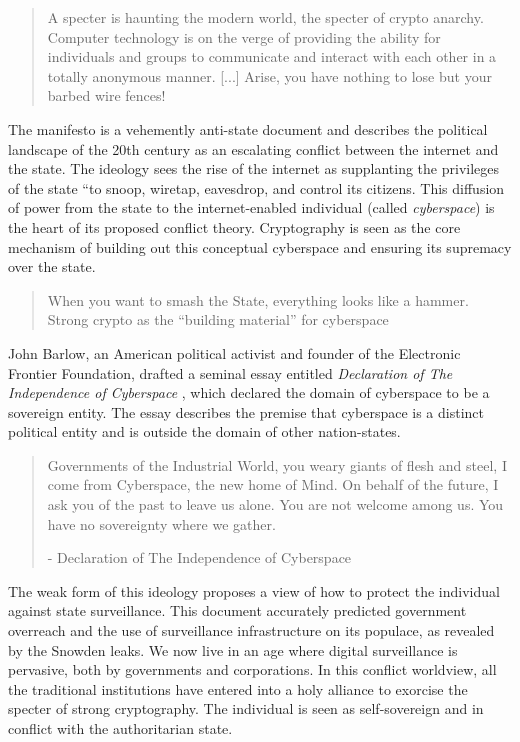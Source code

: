 
\begin{quote}
A specter is haunting the modern world, the specter of crypto anarchy.
Computer technology is on the verge of providing the ability for
individuals and groups to communicate and interact with each other in a
totally anonymous manner. [...] Arise, you have nothing to lose
but your barbed wire fences!
\end{quote}

The manifesto is a vehemently anti-state document and describes the political
landscape of the 20th century as an escalating conflict between the internet and
the state. The ideology sees the rise of the internet as supplanting the
privileges of the state ``to snoop, wiretap, eavesdrop, and control its
citizens.  This diffusion of power from the state to the internet-enabled
individual (called \textit{cyberspace}) is the heart of its proposed conflict
theory. Cryptography is seen as the core mechanism of building out this
conceptual cyberspace and ensuring its supremacy over the state.

\begin{quote}
When you want to smash the State, everything looks like a hammer.
Strong crypto as the ``building material'' for cyberspace
\end{quote}

John Barlow, an American political activist and founder of the Electronic
Frontier Foundation, drafted a seminal essay entitled \textit{Declaration of The
Independence of Cyberspace} \cite{barlow_declaration_2019}, which declared the
domain of cyberspace to be a sovereign entity. The essay describes the premise
that cyberspace is a distinct political entity and is outside the domain of
other nation-states.

\begin{quote}
Governments of the Industrial World, you weary giants of flesh and steel, I come
from Cyberspace, the new home of Mind. On behalf of the future, I ask you of
 the past to leave us alone. You are not welcome among us. You have no
sovereignty where we gather.
\begin{flushright}
- Declaration of The Independence of Cyberspace
\end{flushright}
\end{quote}

The weak form of this ideology proposes a view of how to protect the individual
against state surveillance. This document accurately predicted government
overreach and the use of surveillance infrastructure on its populace, as
revealed by the Snowden leaks. We now live in an age where digital surveillance
is pervasive, both by governments and corporations. In this conflict worldview,
all the traditional institutions have entered into a holy alliance to exorcise
the specter of strong cryptography. The individual is seen as self-sovereign and
in conflict with the authoritarian state.

